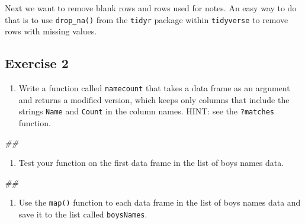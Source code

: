 \documentclass[
]{book}
\newenvironment{Shaded}{\begin{snugshade}}{\end{snugshade}}
\newcommand{\CommentTok}[1]{\textcolor[rgb]{0.56,0.35,0.01}{\textit{#1}}}
\newcommand{\DecValTok}[1]{\textcolor[rgb]{0.00,0.00,0.81}{#1}}
\newcommand{\KeywordTok}[1]{\textcolor[rgb]{0.13,0.29,0.53}{\textbf{#1}}}
\newcommand{\NormalTok}[1]{#1}
\newcommand{\OperatorTok}[1]{\textcolor[rgb]{0.81,0.36,0.00}{\textbf{#1}}}
\newcommand{\StringTok}[1]{\textcolor[rgb]{0.31,0.60,0.02}{#1}}
\providecommand{\tightlist}{%
  \setlength{\itemsep}{0pt}\setlength{\parskip}{0pt}}
\begin{document}
Next we want to remove blank rows and rows used for notes. An easy way
to do that is to use \texttt{drop\_na()} from the \texttt{tidyr} package within \texttt{tidyverse}
to remove rows with missing values.

\begin{Shaded}
\end{Shaded}

\hypertarget{exercise-2-2}{%
\subsection{Exercise 2}\label{exercise-2-2}}

\begin{enumerate}
\def\labelenumi{\arabic{enumi}.}
\tightlist
\item
  Write a function called \texttt{namecount} that takes a data frame as an
  argument and returns a modified version, which keeps only columns that
  include the strings \texttt{Name} and \texttt{Count} in the column names.
  HINT: see the \texttt{?matches} function.
\end{enumerate}

\begin{Shaded}
\begin{Highlighting}[]
\CommentTok{## }
\end{Highlighting}
\end{Shaded}

\begin{enumerate}
\def\labelenumi{\arabic{enumi}.}
\setcounter{enumi}{1}
\tightlist
\item
  Test your function on the first data frame in the list of boys
  names data.
\end{enumerate}

\begin{Shaded}
\begin{Highlighting}[]
\CommentTok{## }
\end{Highlighting}
\end{Shaded}

\begin{enumerate}
\def\labelenumi{\arabic{enumi}.}
\setcounter{enumi}{2}
\tightlist
\item
  Use the \texttt{map()} function to each data frame in the list of boys
  names data and save it to the list called \texttt{boysNames}.
\end{enumerate}
\end{document}
